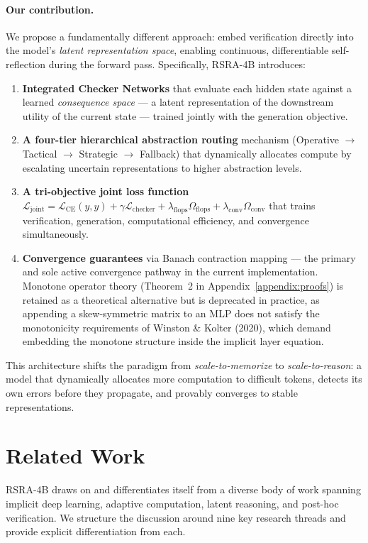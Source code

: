 \documentclass[11pt,a4paper]{article}
\theoremstyle{definition}
\begin{document}
\paragraph{Our contribution.} We propose a fundamentally different approach: embed verification directly into the model's \textit{latent representation space}, enabling continuous, differentiable self-reflection during the forward pass. Specifically, RSRA-4B introduces:
\begin{enumerate}
    \item \textbf{Integrated Checker Networks} that evaluate each hidden state against a learned \textit{consequence space} --- a latent representation of the downstream utility of the current state --- trained jointly with the generation objective.
    \item \textbf{A four-tier hierarchical abstraction routing} mechanism (Operative $\to$ Tactical $\to$ Strategic $\to$ Fallback) that dynamically allocates compute by escalating uncertain representations to higher abstraction levels.
    \item \textbf{A tri-objective joint loss function} $\mathcal{L}_{\text{joint}} = \mathcal{L}_{\text{CE}}(y, \hat{y}) + \gamma \mathcal{L}_{\text{checker}} + \lambda_{\text{flops}} \Omega_{\text{flops}} + \lambda_{\text{conv}} \Omega_{\text{conv}}$ that trains verification, generation, computational efficiency, and convergence simultaneously.
    \item \textbf{Convergence guarantees} via Banach contraction mapping --- the primary and sole active convergence pathway in the current implementation. Monotone operator theory (Theorem~2 in Appendix~\ref{appendix:proofs}) is retained as a theoretical alternative but is deprecated in practice, as appending a skew-symmetric matrix to an MLP does not satisfy the monotonicity requirements of Winston \& Kolter (2020), which demand embedding the monotone structure inside the implicit layer equation.
\end{enumerate}
This architecture shifts the paradigm from \textit{scale-to-memorize} to \textit{scale-to-reason}: a model that dynamically allocates more computation to difficult tokens, detects its own errors before they propagate, and provably converges to stable representations.

\section{Related Work}

RSRA-4B draws on and differentiates itself from a diverse body of work spanning implicit deep learning, adaptive computation, latent reasoning, and post-hoc verification. We structure the discussion around nine key research threads and provide explicit differentiation from each.
\end{document}
